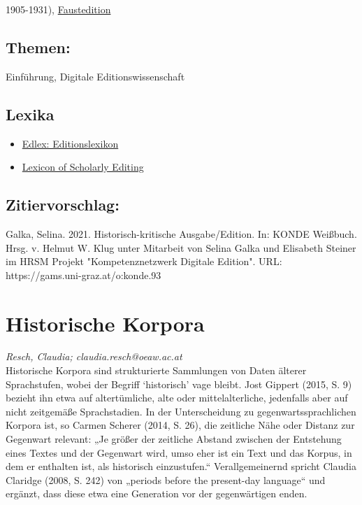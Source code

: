\documentclass{article}
\begin{document}
{                           1905-1931)}, \href{http://faustedition.net/}{Faustedition}\subsection*{Themen:}Einführung, Digitale Editionswissenschaft\subsection*{Lexika}\begin{itemize}\item \href{https://edlex.de/index.php?title=Historisch-kritische_Ausgabe}{Edlex: Editionslexikon}\item \href{https://lexiconse.uantwerpen.be/index.php/lexicon/edition-historical-critical/}{Lexicon of Scholarly Editing}\end{itemize}\subsection*{Zitiervorschlag:}Galka, Selina. 2021. Historisch-kritische Ausgabe/Edition. In: KONDE Weißbuch. Hrsg. v. Helmut W. Klug unter Mitarbeit von Selina Galka und Elisabeth Steiner im HRSM Projekt "Kompetenznetzwerk Digitale Edition". URL: https://gams.uni-graz.at/o:konde.93\newpage\section*{Historische Korpora} \emph{Resch, Claudia; claudia.resch@oeaw.ac.at }\\
        
    Historische Korpora sind strukturierte Sammlungen von Daten älterer Sprachstufen, wobei der Begriff ‘historisch’ vage bleibt. Jost Gippert (2015, S. 9) bezieht ihn etwa auf altertümliche, alte oder mittelalterliche, jedenfalls aber auf nicht zeitgemäße Sprachstadien. In der Unterscheidung zu gegenwartssprachlichen Korpora ist, so Carmen Scherer (2014, S. 26), die zeitliche Nähe oder Distanz zur Gegenwart relevant: „Je größer der zeitliche Abstand zwischen der Entstehung eines Textes und der Gegenwart wird, umso eher ist ein Text und das Korpus, in dem er enthalten ist, als historisch einzustufen.“ Verallgemeinernd spricht Claudia Claridge (2008, S. 242) von „periods before the present-day language“ und ergänzt, dass diese etwa eine Generation vor der gegenwärtigen enden.\\
            
\end{document}

